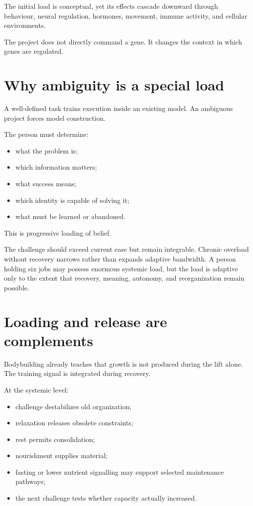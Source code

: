 The initial load is conceptual, yet its effects cascade downward through behaviour, neural regulation, hormones, movement, immune activity, and cellular environments.

The project does not directly command a gene. It changes the context in which genes are regulated.

\section{Why ambiguity is a special load}

A well-defined task trains execution inside an existing model. An ambiguous project forces model construction.

The person must determine:

\begin{itemize}
\tightlist
\item
  what the problem is;
\item
  which information matters;
\item
  what success means;
\item
  which identity is capable of solving it;
\item
  what must be learned or abandoned.
\end{itemize}

This is progressive loading of belief.

The challenge should exceed current ease but remain integrable. Chronic overload without recovery narrows rather than expands adaptive bandwidth. A person holding six jobs may possess enormous systemic load, but the load is adaptive only to the extent that recovery, meaning, autonomy, and reorganization remain possible.

\section{Loading and release are complements}

Bodybuilding already teaches that growth is not produced during the lift alone. The training signal is integrated during recovery.

At the systemic level:

\begin{itemize}
\tightlist
\item
  challenge destabilizes old organization;
\item
  relaxation releases obsolete constraints;
\item
  rest permits consolidation;
\item
  nourishment supplies material;
\item
  fasting or lower nutrient signalling may support selected maintenance pathways;
\item
  the next challenge tests whether capacity actually increased.
\end{itemize}

